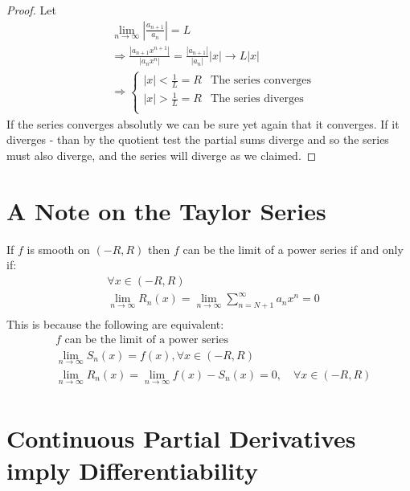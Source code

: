 \documentclass[11pt,a4paper]{article}
\begin{document}
  \begin{proof}
    Let
    \begin{align*}
      &\lim_{n\to\infty}{\left|\frac{a_{n+1}}{a_n}\right|} = L \\
      &\Rightarrow
      \frac{|a_{n+1}x^{n+1}|}{|a_nx^n|} = 
      \frac{|a_{n+1}|}{|a_n|}|x|\to L|x| \\
      &\Rightarrow
      \begin{cases}
      |x|<\frac{1}{L} = R & \text{The series converges} \\
      |x|>\frac{1}{L} = R & \text{The series diverges} \\
      \end{cases}
    \end{align*}
    If the series converges absolutly we can be sure yet again that it converges. 
    If it diverges - than by the quotient test the partial sums 
    diverge and so the series must also diverge, 
    and the series will diverge as we claimed.
  \end{proof}

	\newpage
	
	\section{A Note on the Taylor Series}
	If $f$ is smooth on $(-R,R)$ then $f$ can be the limit of a power series 
  if and only if:
	\begin{align*}
		&\forall x\in(-R,R) \\
		&\lim_{n\to\infty}{R_n(x) = 
		 \lim_{n\to\infty}{\sum_{n=N+1}^\infty}{a_nx^n} = 0} \\
	\end{align*}
	This is because the following are equivalent:
	\begin{align*}
	    &\text{$f$ can be the limit of a power series} \\
		&\lim_{n\to\infty}{S_n(x)=f(x), \forall x\in(-R,R)} \\
		&\lim_{n\to\infty}{R_n(x)} = 
		\lim_{n\to\infty}{f(x)-S_n(x)=0, \quad \forall x\in(-R,R)} \\
	\end{align*}

	\newpage
	
	\section{Continuous Partial Derivatives imply Differentiability}
\end{document}
